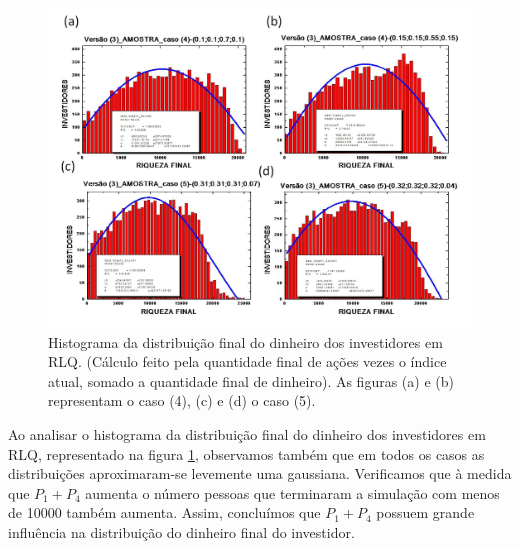 \documentclass[brazil,ruledheader]{abnt}
\begin{document}
\begin{figure}[!h]
\centering
\includegraphics[width=0.8\linewidth]{Figuras/24.jpg}
\caption[Histograma da distribuição final do dinheiro dos investidores em
RLQ]{Histograma da distribuição final do dinheiro dos investidores em RLQ.
(Cálculo feito pela
quantidade final de ações vezes o índice atual, somado a quantidade final de
dinheiro). As figuras (a) e (b) representam o caso (4), (c) e (d) o caso (5).}
\label{fig:histograma2}
\end{figure}

Ao analisar o histograma da distribuição final do dinheiro dos investidores em
RLQ, representado na figura \ref{fig:histograma2},
observamos também que em todos os casos as distribuições aproximaram-se
levemente  uma
gaussiana.  Verificamos que à medida que  $P_1 + P_4$ aumenta o número pessoas
que terminaram a simulação com menos de 10000 também aumenta. Assim, concluímos
que $P_1 + P_4$ possuem grande influência na distribuição do dinheiro final do
investidor.  
\end{document}
